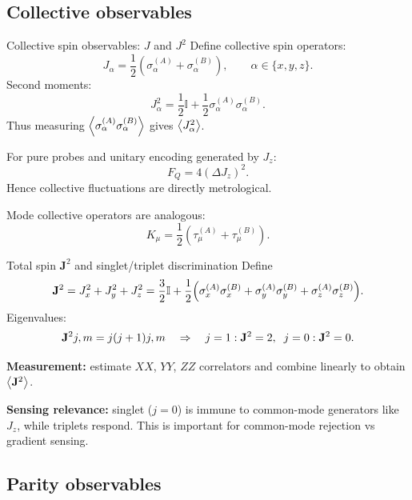 \documentclass[aspectratio=169]{beamer}
\newcommand{\Id}{\mathbb{I}}
\newcommand{\sA}[1]{\sigma_{#1}^{(A)}}
\newcommand{\sB}[1]{\sigma_{#1}^{(B)}}
\newcommand{\tA}[1]{\tau_{#1}^{(A)}}
\newcommand{\tB}[1]{\tau_{#1}^{(B)}}
\newcommand{\Jop}[1]{J_{#1}}
\newcommand{\Kop}[1]{K_{#1}}
\begin{document}
\subsection{Collective observables}

\begin{frame}{Collective spin observables: $J$ and $J^2$}
\small
Define collective spin operators:
\[
\Jop{\alpha}=\frac12(\sA{\alpha}+\sB{\alpha}),
\qquad \alpha\in\{x,y,z\}.
\]
Second moments:
\[
\Jop{\alpha}^2
=
\frac12\Id + \frac12\sA{\alpha}\sB{\alpha}.
\]
Thus measuring $\expval{\sA{\alpha}\sB{\alpha}}$ gives $\expval{J_\alpha^2}$.

\vspace{0.35em}
For pure probes and unitary encoding generated by $\Jop{z}$:
\[
F_Q = 4(\Delta \Jop{z})^2.
\]
Hence collective fluctuations are directly metrological. \citep{Pezze2018RMP,Giovannetti2011NatPhoton}

\vspace{0.35em}
Mode collective operators are analogous:
\[
\Kop{\mu}=\frac12(\tA{\mu}+\tB{\mu}).
\]
\end{frame}

\begin{frame}{Total spin $\mathbf{J}^2$ and singlet/triplet discrimination}
\small
Define
\[
\mathbf{J}^2=\Jop{x}^2+\Jop{y}^2+\Jop{z}^2
=
\frac{3}{2}\Id+\frac12\qty(\sA{x}\sB{x}+\sA{y}\sB{y}+\sA{z}\sB{z}).
\]
Eigenvalues:
\[
\mathbf{J}^2\relax{j,m}=j(j+1)\relax{j,m}
\quad\Rightarrow\quad
j=1:\mathbf{J}^2=2,\;\;j=0:\mathbf{J}^2=0.
\]

\vspace{0.35em}
\textbf{Measurement:} estimate $XX$, $YY$, $ZZ$ correlators and combine linearly to obtain $\expval{\mathbf{J}^2}$.

\vspace{0.35em}
\textbf{Sensing relevance:}
singlet ($j=0$) is immune to common-mode generators like $\Jop{z}$, while triplets respond.
This is important for common-mode rejection vs gradient sensing.
\end{frame}

\subsection{Parity observables}
\end{document}

